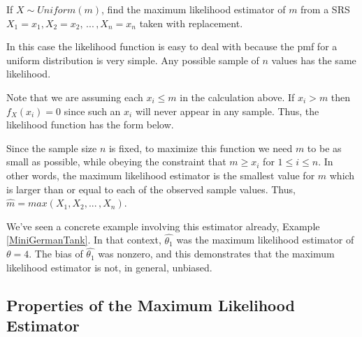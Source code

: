 \begin{examp}\label{TankProblemMLE}
If $X \sim Uniform(m)$, find the maximum likelihood estimator of $m$ from a SRS $X_1 = x_1, X_2 = x_2, \, ... \,, X_n = x_n$ taken with replacement.
\par
\noindent In this case the likelihood function is easy to deal with because the pmf for a uniform distribution is very simple. Any possible sample of $n$ values has the same likelihood.
\par
\noindent Note that we are assuming each $x_i \leq m$ in the calculation above. If $x_i > m$ then $f_X(x_i) = 0$ since such an $x_i$ will never appear in any sample. Thus, the likelihood function has the form below.
\renewcommand*{\arraystretch}{1.35}
\renewcommand*{\arraystretch}{1}
\par
\noindent Since the sample size $n$ is fixed, to maximize this function we need $m$ to be as small as possible, while obeying the constraint that $m \geq x_i$ for $1 \leq i \leq n$. In other words, the maximum likelihood estimator is the smallest value for $m$ which is larger than or equal to each of the observed sample values. Thus, $\widehat{m} = max(X_1,X_2, ...\,, X_n)$.
\end{examp}
\par
We've seen a concrete example involving this estimator already, Example \ref{MiniGermanTank}. In that context, $\widehat{\theta_1}$ was the maximum likelihood estimator of $\theta = 4$. The bias of $\widehat{\theta_1}$ was nonzero, and this demonstrates that the maximum likelihood estimator is not, in general, unbiased.

\subsection*{Properties of the Maximum Likelihood Estimator}

